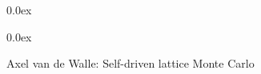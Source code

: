 \documentclass[12pt]{book}
\begin{document}
    \frontmatter

%   

%   
%   


{
\setlength{\parskip}  {0.0ex}
        \tableofcontents
}     

    \mainmatter         

         
%         
%         
%         
%         

\setlength{\parskip}  {0.0ex}

Axel van de Walle: Self-driven lattice Monte Carlo\cite{Walle2002d}
\cleardoublepage
{}




    \appendix
%      
\end{document}
